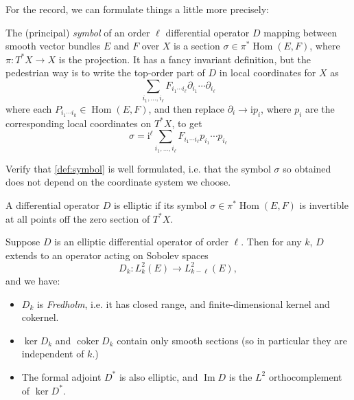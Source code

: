 \documentclass[12pt,letterpaper,reqno]{article}
\numberwithin{equation}{section}
\newcommand{\I}{{\mathrm i}}
\newcommand{\ti}[1]{\textit{#1}}
\DeclareMathOperator{\im}{Im}
\DeclareMathOperator{\Hom}{Hom}
\DeclareMathOperator{\coker}{coker}
\begin{document}
For the record, we can formulate things a little more precisely:
\begin{defn} \label{def:symbol}
The (principal)
\ti{symbol} of an order $\ell$ differential operator $D$ mapping
between smooth vector bundles $E$ and $F$ over $X$ is a section
$\sigma \in \pi^* \Hom(E,F)$, where $\pi: T^* X \to X$ is the projection.
It has a fancy invariant definition, but the pedestrian way is
to write the top-order part of $D$ in local coordinates for $X$ as
\begin{equation}
  \sum_{i_1, \dots, i_\ell} {F_{i_1 \cdots i_\ell}} \partial_{i_1} \cdots \partial_{i_\ell}
\end{equation}
where each $P_{i_1 \cdots i_k} \in \Hom(E,F)$, and then replace
$\partial_{i} \to \I p_i$, where $p_i$ are the corresponding local
coordinates on $T^* X$, to get
\begin{equation}
  \sigma = \I^\ell \sum_{i_1, \dots, i_\ell} {F_{i_1 \cdots i_\ell}} p_{i_1} \cdots p_{i_\ell}
\end{equation}
\end{defn}

\begin{exercise} Verify that \autoref{def:symbol}
is well formulated, i.e. that the symbol $\sigma$ so obtained
does not depend on the coordinate system we choose.
\end{exercise}

\begin{defn}
A differential operator $D$ is elliptic if its
symbol $\sigma \in \pi^* \Hom(E,F)$ is invertible
at all points off the zero section of $T^* X$.
\end{defn}

\begin{thm} \label{thm:elliptic-regularity}
Suppose $D$ is an elliptic differential operator of order $\ell$.
Then for any $k$,
$D$ extends to an operator acting on Sobolev spaces
$$D_k: L^2_k(E) \to L^2_{k-\ell}(E),$$
and we have:
\begin{itemize}
\item $D_k$ is \ti{Fredholm}, i.e. it has closed range,
and finite-dimensional
kernel and cokernel.
\item $\ker D_k$ and $\coker D_k$ contain only
smooth sections (so in particular they are independent of $k$.)
\item The formal adjoint $D^*$ is also elliptic, and
$\im D$ is the $L^2$ orthocomplement of $\ker D^*$.
\end{itemize}
\end{thm}
\end{document}
